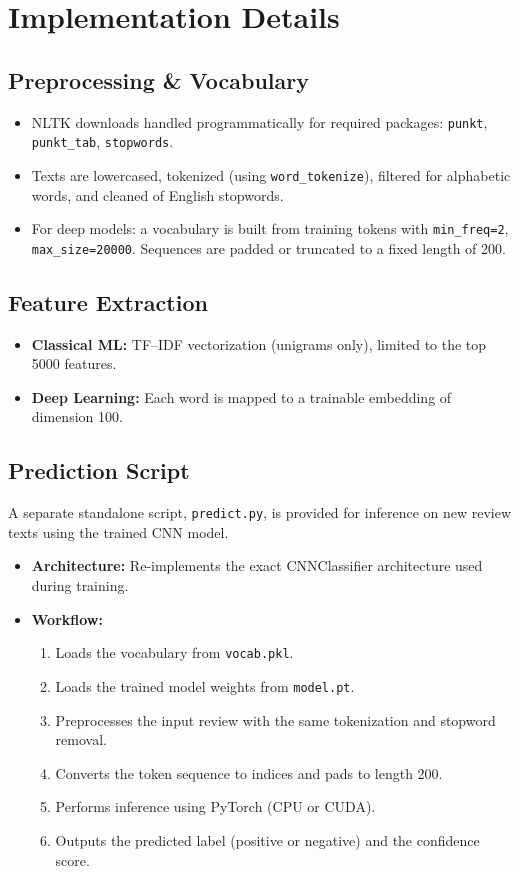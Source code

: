 \documentclass[12pt,a4paper]{article}
\begin{document}
\section{Implementation Details}
\subsection{Preprocessing \& Vocabulary}
\begin{itemize}
  \item NLTK downloads handled programmatically for required packages: \texttt{punkt}, \texttt{punkt\_tab}, \texttt{stopwords}.
  \item Texts are lowercased, tokenized (using \texttt{word\_tokenize}), filtered for alphabetic words, and cleaned of English stopwords.
  \item For deep models: a vocabulary is built from training tokens with \texttt{min\_freq=2}, \texttt{max\_size=20000}. Sequences are padded or truncated to a fixed length of 200.
\end{itemize}

\subsection{Feature Extraction}
\begin{itemize}
  \item \textbf{Classical ML:} TF–IDF vectorization (unigrams only), limited to the top 5000 features.
  \item \textbf{Deep Learning:} Each word is mapped to a trainable embedding of dimension 100.
\end{itemize}

\subsection{Prediction Script}
A separate standalone script, \texttt{predict.py}, is provided for inference on new review texts using the trained CNN model.

\begin{itemize}
  \item \textbf{Architecture:} Re-implements the exact CNNClassifier architecture used during training.
  \item \textbf{Workflow:}
    \begin{enumerate}
      \item Loads the vocabulary from \texttt{vocab.pkl}.
      \item Loads the trained model weights from \texttt{model.pt}.
      \item Preprocesses the input review with the same tokenization and stopword removal.
      \item Converts the token sequence to indices and pads to length 200.
      \item Performs inference using PyTorch (CPU or CUDA).
      \item Outputs the predicted label (positive or negative) and the confidence score.
    \end{enumerate}
\end{itemize}
\end{document}
